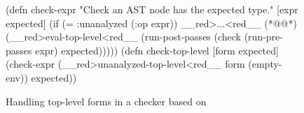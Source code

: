 \begin{figure}
  \lstset{numbers=left}
\begin{cljlisting}
(defn check-expr
  "Check an AST node has the expected type."
  [expr expected]
  (if (= :unanalyzed (:op expr))
    __red>...<red__ (*@\label{analyzer:listing:cta-top-level-driver:unanalyzed-cases}@*)
    (__red>eval-top-level<red__
      (run-post-passes
        (check (run-pre-passes expr)
               expected)))))
(defn check-top-level [form expected]
  (check-expr (__red>unanalyzed-top-level<red__ form (empty-env))
              expected))
\end{cljlisting}
  \caption{Handling top-level forms in a checker based on }
  \label{fig:analyzer:core.typed.analyzer-top-level-driver}
\end{figure}
